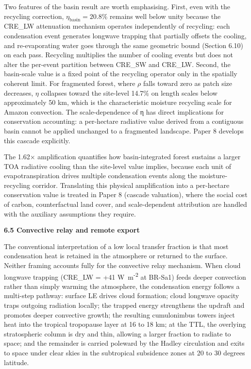Two features of the basin result are worth emphasising. First, even with the recycling correction, \(\eta_{\text{basin}} = 20.8\%\) remains well below unity because the CRE\_LW attenuation mechanism operates independently of recycling: each condensation event generates longwave trapping that partially offsets the cooling, and re-evaporating water goes through the same geometric bound (Section 6.10) on each pass. Recycling multiplies the number of cooling events but does not alter the per-event partition between CRE\_SW and CRE\_LW. Second, the basin-scale value is a fixed point of the recycling operator only in the spatially coherent limit. For fragmented forest, where \(\rho\) falls toward zero as patch size decreases, \(\eta\) collapses toward the site-level 14.7\% on length scales below approximately 50 km, which is the characteristic moisture recycling scale for Amazon convection. The scale-dependence of η has direct implications for conservation accounting: a per-hectare radiative value derived from a contiguous basin cannot be applied unchanged to a fragmented landscape. Paper 8 develops this cascade explicitly.

The 1.62× amplification quantifies how basin-integrated forest sustains a larger TOA radiative cooling than the site-level value implies, because each unit of evapotranspiration drives multiple condensation events along the moisture-recycling corridor. Translating this physical amplification into a per-hectare conservation value is treated in Paper 8 (cascade valuation), where the social cost of carbon, counterfactual land cover, and scale-dependent attribution are handled with the auxiliary assumptions they require.

\textbf{6.5 Convective relay and remote export}

The conventional interpretation of a low local transfer fraction is that most condensation heat is retained in the atmosphere or returned to the surface. Neither framing accounts fully for the convective relay mechanism. When cloud longwave trapping (CRE\_LW = +41 W~m\textsuperscript{-2} at BR-Sa1) feeds deeper convection rather than simply warming the atmosphere, the condensation energy follows a multi-step pathway: surface LE drives cloud formation; cloud longwave opacity traps outgoing radiation locally; the trapped energy strengthens the updraft and promotes deeper convective growth; the resulting cumulonimbus towers inject heat into the tropical tropopause layer at 16 to 18 km; at the TTL, the overlying stratospheric column is dry and thin, allowing a larger fraction to radiate to space; and the remainder is carried poleward by the Hadley circulation and exits to space under clear skies in the subtropical subsidence zones at 20 to 30 degrees latitude.

